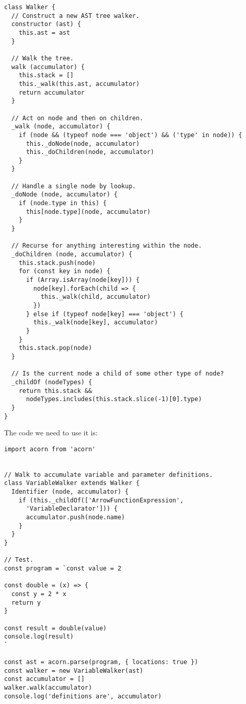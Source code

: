 \documentclass[krantzl]{krantz}
\begin{document}
\begin{lstlisting}[frame=tblr]
class Walker {
  // Construct a new AST tree walker.
  constructor (ast) {
    this.ast = ast
  }

  // Walk the tree.
  walk (accumulator) {
    this.stack = []
    this._walk(this.ast, accumulator)
    return accumulator
  }

  // Act on node and then on children.
  _walk (node, accumulator) {
    if (node && (typeof node === 'object') && ('type' in node)) {
      this._doNode(node, accumulator)
      this._doChildren(node, accumulator)
    }
  }

  // Handle a single node by lookup.
  _doNode (node, accumulator) {
    if (node.type in this) {
      this[node.type](node, accumulator)
    }
  }

  // Recurse for anything interesting within the node.
  _doChildren (node, accumulator) {
    this.stack.push(node)
    for (const key in node) {
      if (Array.isArray(node[key])) {
        node[key].forEach(child => {
          this._walk(child, accumulator)
        })
      } else if (typeof node[key] === 'object') {
        this._walk(node[key], accumulator)
      }
    }
    this.stack.pop(node)
  }

  // Is the current node a child of some other type of node?
  _childOf (nodeTypes) {
    return this.stack &&
      nodeTypes.includes(this.stack.slice(-1)[0].type)
  }
}
\end{lstlisting}



\noindent The code we need to use it is:


\begin{lstlisting}[frame=tblr]
import acorn from 'acorn'


// Walk to accumulate variable and parameter definitions.
class VariableWalker extends Walker {
  Identifier (node, accumulator) {
    if (this._childOf(['ArrowFunctionExpression',
      'VariableDeclarator'])) {
      accumulator.push(node.name)
    }
  }
}

// Test.
const program = `const value = 2

const double = (x) => {
  const y = 2 * x
  return y
}

const result = double(value)
console.log(result)
`

const ast = acorn.parse(program, { locations: true })
const walker = new VariableWalker(ast)
const accumulator = []
walker.walk(accumulator)
console.log('definitions are', accumulator)
\end{lstlisting}
\end{document}
